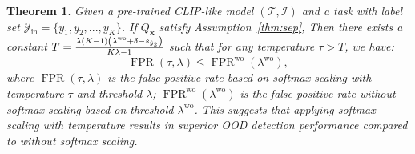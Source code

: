\documentclass{article}
\def\*#1{\mathbf{#1}}
\newtheorem{theorem}{Theorem}[section]
\begin{document}
\begin{theorem}
Given a pre-trained CLIP-like model $(\mathcal{T}, \mathcal{I})$ and a task with label set $\mathcal{Y}_\text{in}=\{y_1, y_2,...,y_K\}$. If $Q_{\*x}$ satisfy Assumption~\ref{thm:sep}, Then there exists a constant $T = { \lambda(K - 1)\left(\lambda^{\text{wo}} + \delta - s_{\hat{y}_{2}}\right) \over K\lambda-1} $ such that for any temperature $\tau>T$,
we have:
$$
\operatorname{FPR}(\tau, \lambda) \leq \operatorname{FPR}^{\text{wo}}(\lambda^{\text{wo}} ),
$$
where $\operatorname{FPR}(\tau, \lambda)$ is the false positive rate based on softmax scaling with temperature $\tau$ and threshold $\lambda$; $ \operatorname{FPR}^{\text{wo}}(\lambda^{\text{wo}} )$ is the false positive rate without softmax scaling based on threshold $\lambda^{\text{wo}}$. This suggests that applying softmax scaling with temperature results in superior OOD detection performance compared to without softmax scaling. 
\end{theorem}
\end{document}
